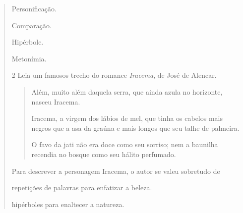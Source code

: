 \begin{quote}
{\begin{escolha}

  \item Personificação.
  
  \item Comparação.
  
  \item Hipérbole.
  
  \item Metonímia. 

\end{escolha}


\num{2} Leia um famosos trecho do romance \textit{Iracema}, de José de Alencar.

\begin{quote}

Além, muito além daquela serra, que ainda azula no
horizonte, nasceu Iracema.

Iracema, a virgem dos lábios de mel, que tinha os
cabelos mais negros que a asa da graúna e mais longos
que seu talhe de palmeira.

O favo da jati não era doce como seu sorriso; nem
a baunilha recendia no bosque como seu hálito perfumado.

\end{quote}


Para descrever a personagem Iracema, o autor se valeu sobretudo de

\begin{escolha}

  \item repetições de palavras para enfatizar a beleza. 

  \item hipérboles para enaltecer a natureza.


\end{escolha}}
\end{quote}
